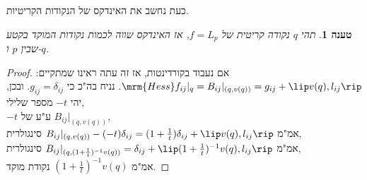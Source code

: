 \documentclass{article}
\newtheorem*{claim*}{טענה}
\theoremstyle{definition}
\begin{document}
	כעת נחשב את האינדקס של הנקודות הקריטיות.
	\begin{claim*}
		תהי
		\(q\)
		נקודה קריטית של
		\(f=L_p\),
		אז האינדקס שווה לכמות נקודות המוקד בקטע שבין \(p\) ו-\(q\).
	\end{claim*}
	\begin{proof}
		אם נעבוד בקורדינטות, אז זה עתה ראינו שמתקיים:
		\(
			\mrm{Hess}f_{ij}|_q
			= B_{ij}|_{(q,v(q))}
			= g_{ij} + \lip v(q),l_{ij} \rip
		\).
		נניח בה"כ כי
		\(g_{ij}=\delta_{ij}\).
		ובכן, יהי
		\(-t\)
		מספר שלילי,
		\\
		\(-t\)
		ע"ע של
		\(B_{ij}|_{(q,v(q))}\),
		\\
		אמ"מ
		\(B_{ij}|_{(q,v(q))}-(-t)\delta_{ij} = (1+\frac{1}{t})\delta_{ij} + \lip v(q),l_{ij} \rip\)
		סינגולרית,
		\\
		אמ"מ
		\(B_{ij}|_{(q,(1+\frac{1}{t})^{-1}v(q))}=\delta_{ij} + \lip (1+\frac{1}{t})^{-1}v(q),l_{ij} \rip\)
		סינגולרית,
		\\
		אמ"מ
		\((1+\frac{1}{t})^{-1}v(q)\)
		נקודת מוקד.
	\end{proof}
	
\end{document}
